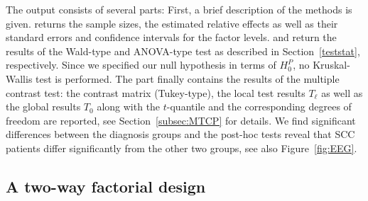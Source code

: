The output consists of several parts: First, a brief description of the methods 
is given.  returns the sample sizes, the estimated relative 
effects as well as their standard errors and confidence intervals for the 
factor levels.  and  
return the results of the Wald-type and ANOVA-type test as described in 
Section~\ref{teststat}, respectively. Since we specified our null hypothesis in 
terms of $H_0^P$, no Kruskal-Wallis test is performed. The part  
finally contains the results of the multiple contrast test: the contrast matrix 
(Tukey-type), the local test results $T_\ell$ as well as the global results 
$T_0$ along with the $t$-quantile and the corresponding degrees of freedom 
\citep{konietschke2012rank} are reported, see Section~\ref{subsec:MTCP} for 
details. We find significant differences between the diagnosis groups and the 
post-hoc tests reveal that SCC patients differ significantly from the other two 
groups, see also Figure~\ref{fig:EEG}.


\subsection{A two-way factorial design} 

